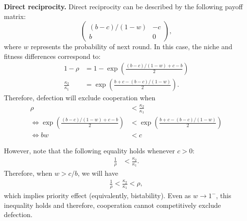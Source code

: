 \documentclass[12pt]{article}
\begin{document}
\textbf{Direct reciprocity.}
Direct reciprocity can be described by the following payoff matrix:
\begin{equation}
\begin{pmatrix}
(b-c)/(1-w) & -c \\
b & 0
\end{pmatrix},
\end{equation}
where $w$ represents the probability of next round. 
In this case, the niche and fitness differences correspond to:
\begin{align}
1-\rho &= 1- \exp\left(\frac{(b-c)/(1-w) + c - b}{2}\right) \\
\frac{\kappa_2}{\kappa_1} &= \exp\left(\frac{b+c-(b-c)/(1-w)}{2}\right).
\end{align}
Therefore, defection will exclude cooperation when 
\begin{align}
\rho &< \frac{\kappa_2}{\kappa_1}\\
\iff \exp\left(\frac{(b-c)/(1-w) + c - b}{2}\right) &< \exp\left(\frac{b+c-(b-c)/(1-w)}{2}\right)\\
\iff bw &< c
\end{align}

However, note that the following equality holds whenever $c > 0$:
\begin{align}
\frac{1}{\rho} &< \frac{\kappa_2}{\kappa_1}.
\end{align}
Therefore, when $w > c/b$, we will have
\begin{align}
\frac{1}{\rho} < \frac{\kappa_2}{\kappa_1} < \rho,
\end{align}
which implies priority effect (equivalently, bistability).
Even as $w \to 1^-$, this inequality holds and therefore, cooperation cannot competitively exclude defection.
\end{document}
